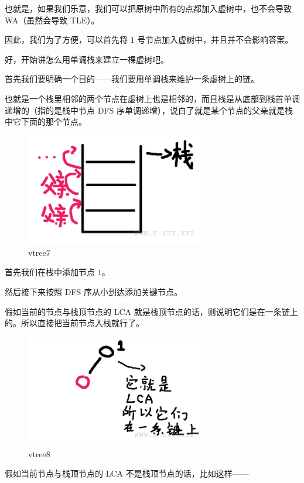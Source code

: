 也就是，如果我们乐意，我们可以把原树中所有的点都加入虚树中，也不会导致 WA（虽然会导致 TLE）。

因此，我们为了方便，可以首先将 $1$ 号节点加入虚树中，并且并不会影响答案。

好，开始讲怎么用单调栈来建立一棵虚树吧。

首先我们要明确一个目的——我们要用单调栈来维护一条虚树上的链。

也就是一个栈里相邻的两个节点在虚树上也是相邻的，而且栈是从底部到栈首单调递增的（指的是栈中节点 DFS 序单调递增），说白了就是某个节点的父亲就是栈中它下面的那个节点。

\begin{figure}[htbp]
\centering
\includegraphics[width=0.7\textwidth]{docs/ds/images/vtree7.png} 
\caption{vtree7}
\end{figure}

首先我们在栈中添加节点 $1$。

然后接下来按照 DFS 序从小到达添加关键节点。

假如当前的节点与栈顶节点的 LCA 就是栈顶节点的话，则说明它们是在一条链上的。所以直接把当前节点入栈就行了。

\begin{figure}[htbp]
\centering
\includegraphics[width=0.7\textwidth]{docs/ds/images/vtree8.png} 
\caption{vtree8}
\end{figure}

假如当前节点与栈顶节点的 LCA 不是栈顶节点的话，比如这样——

